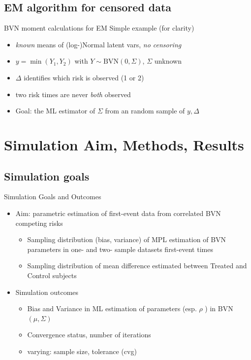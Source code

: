 \documentclass{beamer}
\providecommand{\tightlist}{%
\setlength{\itemsep}{0pt}\setlength{\parskip}{0pt}}
\begin{document}
\subsection{EM algorithm for censored data}

\begin{frame}{BVN moment calculations for EM}
Simple example (for clarity)

\begin{itemize}
\item
  \emph{known} means of (log-)Normal latent vars, \emph{no censoring}
\item
  \(y=\min(Y_1,Y_2)\) with \(Y \sim \text{BVN}(0, \Sigma)\), \(\Sigma\)
  unknown
\item
  \(\Delta\) identifies which risk is observed (1 or 2)
\item
  two risk times are never \emph{both} observed
\item
  Goal: the ML estimator of \(\Sigma\) from an random sample of
  \(y, \Delta\)
\end{itemize}
\end{frame}


\section{Simulation Aim, Methods, Results}

\subsection{Simulation goals}

\begin{frame}{Simulation Goals and Outcomes}
\begin{itemize}
\item
  \alert{Aim:} parametric estimation of \alert{first-event data} from correlated
  BVN competing risks

  \begin{itemize}
  \tightlist
  \item
    Sampling distribution (\alert{bias, variance}) of MPL estimation of
    BVN parameters in one- and two- sample datasets  first-event times
  \item
    Sampling distribution of mean difference estimated between Treated
    and Control subjects
  \end{itemize}

\item Simulation outcomes
  \begin{itemize}
  \tightlist
  \item Bias and Variance in ML estimation of parameters (esp. \( \rho \) ) in BVN\( (\mu,\Sigma) \)
  \item Convergence status, number of iterations
  \item varying: sample size, tolerance (cvg)
  \end{itemize}
\end{itemize}
\end{frame}
\end{document}
